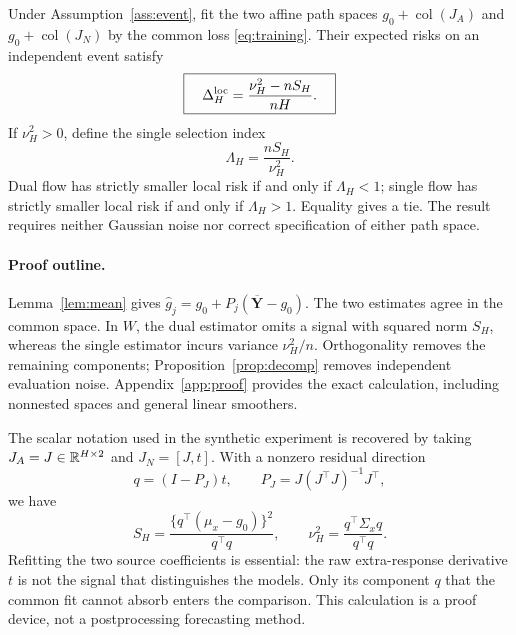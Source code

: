\begin{theorem}
\label{thm:main}
Under Assumption~\ref{ass:event}, fit the two affine path spaces $g_0+\operatorname{col}(J_A)$ and $g_0+\operatorname{col}(J_N)$ by the common loss \eqref{eq:training}. Their expected risks on an independent event satisfy
\begin{equation}
 \boxed{\quad \Delta_H^{\rm loc}
 =\frac{\nu_H^2-nS_H}{nH}.\quad}
 \label{eq:mainrisk}
\end{equation}
If $\nu_H^2>0$, define the single selection index
\begin{equation}
 \Lambda_H=\frac{nS_H}{\nu_H^2}.
 \label{eq:lambda}
\end{equation}
Dual flow has strictly smaller local risk if and only if $\Lambda_H<1$; single flow has strictly smaller local risk if and only if $\Lambda_H>1$. Equality gives a tie. The result requires neither Gaussian noise nor correct specification of either path space.
\end{theorem}

\paragraph{Proof outline.}
Lemma~\ref{lem:mean} gives $\widehat g_j=g_0+P_j(\overline{\mathbf Y}-g_0)$. The two estimates agree in the common space. In $W$, the dual estimator omits a signal with squared norm $S_H$, whereas the single estimator incurs variance $\nu_H^2/n$. Orthogonality removes the remaining components; Proposition~\ref{prop:decomp} removes independent evaluation noise. Appendix~\ref{app:proof} provides the exact calculation, including nonnested spaces and general linear smoothers.

The scalar notation used in the synthetic experiment is recovered by taking $J_A=J\in\mathbb R^{H\times2}$ and $J_N=[J,t]$. With a nonzero residual direction
\begin{equation}
 q=(I-P_J)t,\qquad P_J=J(J^\top J)^{-1}J^\top,
 \label{eq:q}
\end{equation}
we have
\begin{equation}
 S_H=\frac{\{q^\top(\mu_x-g_0)\}^2}{q^\top q},\qquad
 \nu_H^2=\frac{q^\top\Sigma_xq}{q^\top q}.
 \label{eq:signal_noise}
\end{equation}
Refitting the two source coefficients is essential: the raw extra-response derivative $t$ is not the signal that distinguishes the models. Only its component $q$ that the common fit cannot absorb enters the comparison. This calculation is a proof device, not a postprocessing forecasting method.

